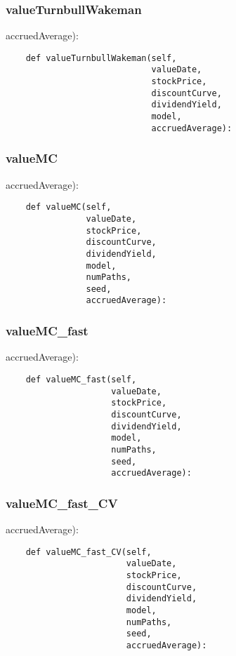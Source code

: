 \documentclass[twoside,11pt]{book}
\begin{document}
\subsubsection*{{\bf valueTurnbullWakeman}}
accruedAverage): 

\begin{lstlisting}
    def valueTurnbullWakeman(self,
                             valueDate,
                             stockPrice,
                             discountCurve,
                             dividendYield,
                             model,
                             accruedAverage):
\end{lstlisting}

\subsubsection*{{\bf valueMC}}
accruedAverage): 

\begin{lstlisting}
    def valueMC(self,
                valueDate,
                stockPrice,
                discountCurve,
                dividendYield,
                model,
                numPaths,
                seed,
                accruedAverage):
\end{lstlisting}

\subsubsection*{{\bf valueMC\_fast}}
accruedAverage): 

\begin{lstlisting}
    def valueMC_fast(self,
                     valueDate,
                     stockPrice,
                     discountCurve,
                     dividendYield,
                     model,
                     numPaths,
                     seed,
                     accruedAverage):
\end{lstlisting}

\subsubsection*{{\bf valueMC\_fast\_CV}}
accruedAverage): 

\begin{lstlisting}
    def valueMC_fast_CV(self,
                        valueDate,
                        stockPrice,
                        discountCurve,
                        dividendYield,
                        model,
                        numPaths,
                        seed,
                        accruedAverage):
\end{lstlisting}
\end{document}
